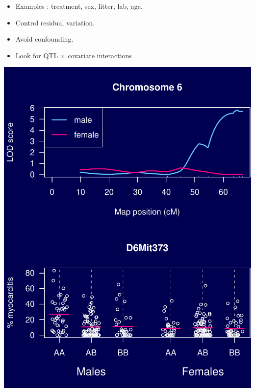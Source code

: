 \documentclass[12pt]{article}
\newcommand{\smallestsize}{\fontsize{18}{22} \selectfont}
\begin{document}
\hspace*{0.5in}
\begin{minipage}[t]{4.1in}
\vspace*{25mm}

\sloppy
\smallestsize
\begin{itemize}
\setlength{\rightskip}{0pt plus 1fil} %
\item {\color{mypink} Examples} : treatment, sex, litter, lab, age.
\item Control residual variation.
\item Avoid confounding.
\item Look for QTL $\times$ covariate interactions
\end{itemize}
\end{minipage}
\hfill
\begin{minipage}[t]{5.3in}
\vspace*{0mm}

\includegraphics{Figs/covar.pdf}
\end{minipage}
\end{document}
